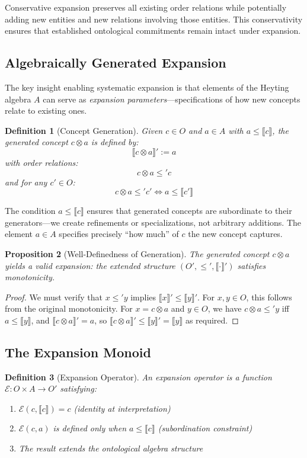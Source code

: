 \documentclass[11pt,a4paper]{article}
\newtheorem{definition}{Definition}[section]
\newtheorem{proposition}[definition]{Proposition}
\newcommand{\sem}[1]{\llbracket #1 \rrbracket}
\begin{document}
Conservative expansion preserves all existing order relations while potentially adding new entities and new relations involving those entities. This conservativity ensures that established ontological commitments remain intact under expansion.

\subsection{Algebraically Generated Expansion}

The key insight enabling systematic expansion is that elements of the Heyting algebra $A$ can serve as \emph{expansion parameters}---specifications of how new concepts relate to existing ones.

\begin{definition}[Concept Generation]
Given $c \in O$ and $a \in A$ with $a \leq \sem{c}$, the \emph{generated concept} $c \otimes a$ is defined by:
$$
\sem{c \otimes a}' := a
$$
with order relations:
$$
c \otimes a \leq' c
$$
and for any $c' \in O$:
$$
c \otimes a \leq' c' \iff a \leq \sem{c'}
$$
\end{definition}

The condition $a \leq \sem{c}$ ensures that generated concepts are subordinate to their generators---we create refinements or specializations, not arbitrary additions. The element $a \in A$ specifies precisely ``how much'' of $c$ the new concept captures.

\begin{proposition}[Well-Definedness of Generation]
The generated concept $c \otimes a$ yields a valid expansion: the extended structure $(O', \leq', \sem{\cdot}')$ satisfies monotonicity.
\end{proposition}

\begin{proof}
We must verify that $x \leq' y$ implies $\sem{x}' \leq \sem{y}'$. For $x, y \in O$, this follows from the original monotonicity. For $x = c \otimes a$ and $y \in O$, we have $c \otimes a \leq' y$ iff $a \leq \sem{y}$, and $\sem{c \otimes a}' = a$, so $\sem{c \otimes a}' \leq \sem{y}' = \sem{y}$ as required.
\end{proof}

\subsection{The Expansion Monoid}

\begin{definition}[Expansion Operator]
An \emph{expansion operator} is a function $\mathcal{E} : O \times A \to O'$ satisfying:
\begin{enumerate}
    \item $\mathcal{E}(c, \sem{c}) = c$ (identity at interpretation)
    \item $\mathcal{E}(c, a)$ is defined only when $a \leq \sem{c}$ (subordination constraint)
    \item The result extends the ontological algebra structure
\end{enumerate}
\end{definition}
\end{document}
